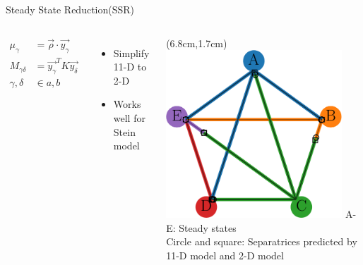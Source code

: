\documentclass[15pt]{beamer}
\begin{document}
\begin{frame}{Steady State Reduction(SSR)}
\begin{columns}
\begin{align*}
\mu_\gamma &= \vec{\rho} \cdot \vec{y_\gamma}\\
M_{\gamma \delta} &= \vec{y_\gamma}^T K \vec{y_\delta}\\
      \gamma,\delta &\in a,b
\end{align*}

\begin{itemize}
	\item Simplify 11-D to 2-D
	\item Works well for Stein model
\end{itemize}

	\begin{textblock*}{6cm}(6.8cm,1.7cm) %
	 \includegraphics[width=0.9\textwidth]{attractor_network_v3}
	 {A-E: Steady states\\ Circle and square: Separatrices predicted by 11-D model and 2-D model}
	\end{textblock*}
\end{columns}
\end{frame}
\end{document}
